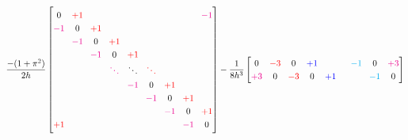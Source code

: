 \begin{equation*}
\renewcommand{\arraystretch}{1.25} %
\renewcommand{\arraycolsep}{4.15pt} %
\frac{-(1+\pi^2)}{2 h}
\begin{bmatrix}
0           & \ca +1   &             &             &             &             &             &             & \cb -1      \\
\cb -1      & 0        & \ca +1      &             &             &             &             &             &             \\
            & \cb -1   & 0           & \ca +1      &             &             &             &             &             \\
            &          & \cb -1      & 0           & \ca +1      &             &             &             &             \\
            &          &             & \cb \ddots  & \ddots      & \ca \ddots  &             &             &             \\
            &          &             &             & \cb -1      & 0           & \ca +1      &             &             \\
            &          &             &             &             & \cb -1      & 0           & \ca +1      &             \\
            &          &             &             &             &             & \cb -1      & 0           & \ca +1      \\
\ca +1      &          &             &             &             &             &             & \cb -1      & 0           \\
\end{bmatrix}
-\frac{1}{8 h^3}
\begin{bmatrix}
0           & \ca -3      & 0           & \cc +1      &             &             & \cd -1      & 0           & \cb +3      \\
\cb +3      & 0           & \ca -3      & 0           & \cc +1      &             &             & \cd -1      & 0           \\

\end{bmatrix}
\end{equation*}
